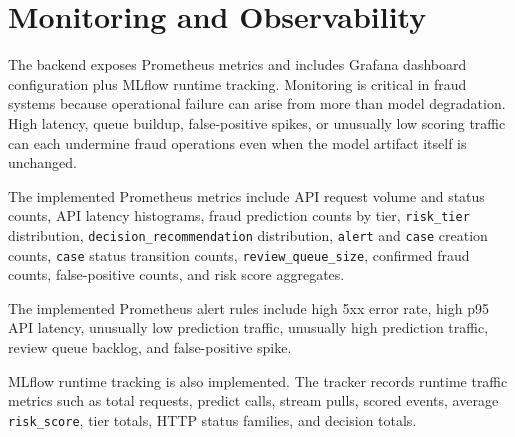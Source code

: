 \documentclass[11pt]{article}
\newcommand{\code}[1]{\texttt{#1}}
\begin{document}
\section{Monitoring and Observability}
The backend exposes Prometheus metrics and includes Grafana dashboard configuration plus MLflow runtime tracking. Monitoring is critical in fraud systems because operational failure can arise from more than model degradation. High latency, queue buildup, false-positive spikes, or unusually low scoring traffic can each undermine fraud operations even when the model artifact itself is unchanged.

The implemented Prometheus metrics include API request volume and status counts, API latency histograms, fraud prediction counts by tier, \code{risk_tier} distribution, \code{decision_recommendation} distribution, \code{alert} and \code{case} creation counts, \code{case} status transition counts, \code{review_queue_size}, confirmed fraud counts, false-positive counts, and risk score aggregates.

The implemented Prometheus alert rules include high 5xx error rate, high p95 API latency, unusually low prediction traffic, unusually high prediction traffic, review queue backlog, and false-positive spike.

MLflow runtime tracking is also implemented. The tracker records runtime traffic metrics such as total requests, predict calls, stream pulls, scored events, average \code{risk_score}, tier totals, HTTP status families, and decision totals.
\end{document}
